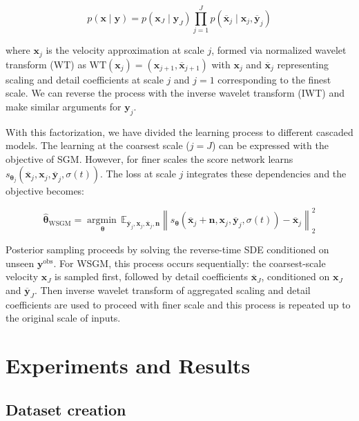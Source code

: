 \documentclass[
]{article}
\begin{document}
\[
p(\mathbf{x} \mid \mathbf{y}) = p(\mathbf{x}_J \mid \mathbf{y}_J) \prod_{j = 1}^{J} p(\overline{\mathbf{x}}_j \mid \mathbf{x}_j, \overline{\mathbf{y}}_j)
\]

where \(\mathbf{x}_j\) is the velocity approximation at scale \(j\),
formed via normalized wavelet transform (WT) as
\(\text{WT}(\mathbf{x}_{j}) = (\mathbf{x}_{j+1}, \overline{\mathbf{x}}_{j+1})\)
with \(\mathbf{x}_j\) and \(\overline{\mathbf{x}}_j\) representing
scaling and detail coefficients at scale \(j\) and \(j=1\) corresponding
to the finest scale. We can reverse the process with the inverse wavelet
transform (IWT) and make similar arguments for \(\mathbf{y}_j\).

With this factorization, we have divided the learning process to
different cascaded models. The learning at the coarsest scale (\(j=J\))
can be expressed with the objective of SGM. However, for finer scales
the score network learns
\(s_{\boldsymbol{\theta}_j}(\overline{\mathbf{x}}_j, \mathbf{x}_j, \overline{\mathbf{y}}_j,\sigma(t))\).
The loss at scale \(j\) integrates these dependencies and the objective
becomes:

\[
\widehat{\boldsymbol{\theta}}_{\text{WSGM}} = \mathop{\mathrm{argmin}\,}\limits_{\boldsymbol{\theta}}\mathbb{E}_{\overline{\mathbf{y}}_j,\mathbf{x}_j,\overline{\mathbf{x}}_j,\mathbf{n}} \left\| s_{\boldsymbol{\theta}}(\overline{\mathbf{x}}_j + \mathbf{n}, \mathbf{x}_j, \overline{\mathbf{y}}_j, \sigma(t)) - \overline{\mathbf{x}}_j \right\|_2^2
\]

Posterior sampling proceeds by solving the reverse-time SDE conditioned
on unseen \(\mathbf{y}^{\text{obs}}\). For WSGM, this process occurs
sequentially: the coarsest-scale velocity \(\mathbf{x}_J\) is sampled
first, followed by detail coefficients \(\overline{\mathbf{x}}_J\),
conditioned on \(\mathbf{x}_J\) and \(\overline{\mathbf{y}}_J\). Then
inverse wavelet transform of aggregated scaling and detail coefficients
are used to proceed with finer scale and this process is repeated up to
the original scale of inputs.

\section{Experiments and Results}\label{experiments-and-results}

\subsection{Dataset creation}\label{dataset-creation}
\end{document}
